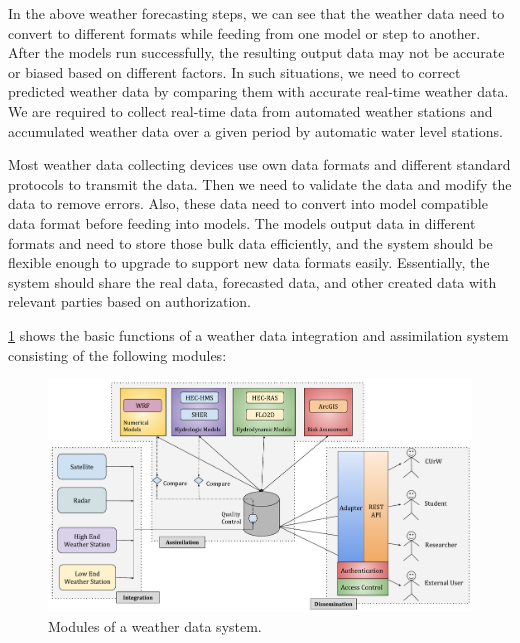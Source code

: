 In the above weather forecasting steps, we can see that the weather data need to convert to different formats while feeding from one model or step to another. After the models run successfully, the resulting output data may not be accurate or biased based on different factors. In such situations, we need to correct predicted weather data by comparing them with accurate real-time weather data. We are required to collect real-time data from automated weather stations and accumulated weather data over a given period by automatic water level stations.

Most weather data collecting devices use own data formats and different standard protocols to transmit the data. Then we need to validate the data and modify the data to remove errors. Also, these data need to convert into model compatible data format before feeding into models. The models output data in different formats and need to store those bulk data efficiently, and the system should be flexible enough to upgrade to support new data formats easily. Essentially, the system should share the real data, forecasted data, and other created data with relevant parties based on authorization.



\cref{fi:wdia_components} shows the basic functions of a weather data integration and assimilation system consisting of the following modules: 

\begin{figure}[htbp]
\centerline{\includegraphics[width=1\textwidth]{method/misc/weather_data_system_components.pdf}}
\caption{Modules of a weather data system.}
\label{fi:wdia_components}
\end{figure}

